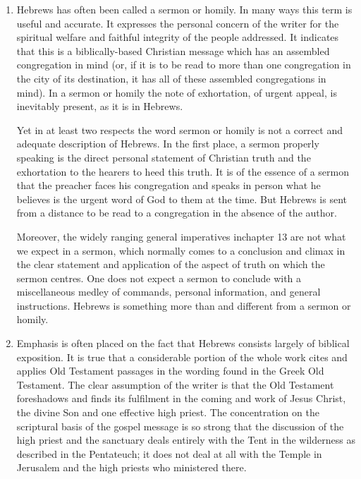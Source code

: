 \begin{enumerate}
\item Hebrews has often been called a sermon or homily.
In many ways this term is useful and accurate.
It expresses the personal concern of the writer for the spiritual welfare and
faithful integrity of the people addressed.
It indicates that this is a biblically-based Christian message which has an
assembled congregation in mind (or, if it is to be read to more than one
congregation in the city of its destination, it has all of these assembled
congregations in mind).
In a sermon or homily the note of exhortation, of urgent appeal, is inevitably
present, as it is in Hebrews.
\newline

Yet in at least two respects the word sermon or homily is not a correct and
adequate description of Hebrews.
In the first place, a sermon properly speaking is the direct personal statement
of Christian truth and the exhortation to the hearers to heed this truth.
It is of the essence of a sermon that the preacher faces his congregation and
speaks in person what he believes is the urgent word of God to them at the time.
But Hebrews is sent from a distance to be read to a congregation in the absence
of the author.
\newline

Moreover, the widely ranging general imperatives inchapter 13 are not what we
expect in a sermon, which normally comes to a conclusion and climax in the clear
statement and application of the aspect of truth on which the sermon centres.
One does not expect a sermon to conclude with a miscellaneous medley of
commands, personal information, and general instructions.
Hebrews is something more than and different from a sermon or homily.

\item Emphasis is often placed on the fact that Hebrews consists largely of
biblical exposition.
It is true that a considerable portion of the whole work cites and applies Old
Testament passages in the wording found in the Greek Old Testament.
The clear assumption of the writer is that the Old Testament foreshadows and
finds its fulfilment in the coming and work of Jesus Christ, the divine Son and
one effective high priest.
The concentration on the scriptural basis of the gospel message is so strong
that the discussion of the high priest and the sanctuary deals entirely with the
Tent in the wilderness as described in the Pentateuch; it does not deal at all
with the Temple in Jerusalem and the high priests who ministered there.
\newline


\end{enumerate}
